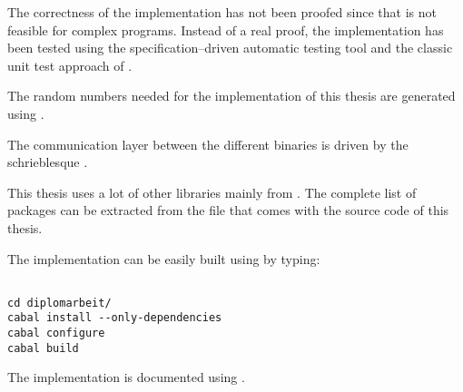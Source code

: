 
The correctness of the implementation has not been proofed since that is not
feasible for complex programs. Instead of a real proof, the implementation
has been tested using the specification--driven automatic \JWThaskell{} testing
tool \JWTquickcheck{} \cite{quickcheck} and the classic unit test approach of
\JWTLhunit{}.



The random numbers needed for the implementation of this thesis are generated
using \JWTLmonadcryptorandom{}.



The communication layer between the different binaries is driven by the
schrieblesque \JWTXLprotobuf{}.



This thesis uses a lot of other libraries mainly from \JWTLhackage{}. The
complete list of packages can be extracted from the file
 that comes with the source code of this thesis.



The implementation can be easily built using \JWTLcabal{} by typing:

\begin{lstlisting}

cd diplomarbeit/
cabal install --only-dependencies
cabal configure
cabal build

\end{lstlisting}


%
%
\label{sec:implementation-doc}

The implementation is documented using \JWTLhaddock{}.



